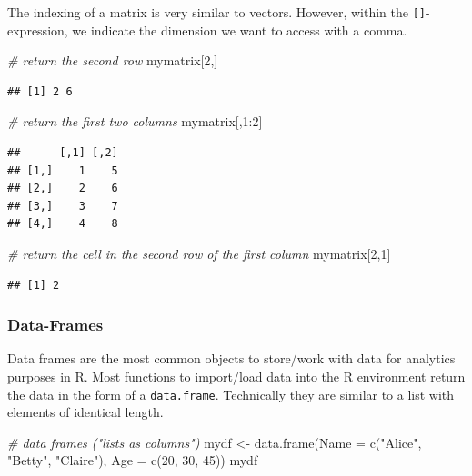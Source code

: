 \documentclass[
  12pt,
]{style/krantz}
\newenvironment{Shaded}{\begin{snugshade}}{\end{snugshade}}
\newcommand{\AttributeTok}[1]{\textcolor[rgb]{0.77,0.63,0.00}{#1}}
\newcommand{\CommentTok}[1]{\textcolor[rgb]{0.56,0.35,0.01}{\textit{#1}}}
\newcommand{\DecValTok}[1]{\textcolor[rgb]{0.00,0.00,0.81}{#1}}
\newcommand{\FunctionTok}[1]{\textcolor[rgb]{0.00,0.00,0.00}{#1}}
\newcommand{\NormalTok}[1]{#1}
\newcommand{\OtherTok}[1]{\textcolor[rgb]{0.56,0.35,0.01}{#1}}
\newcommand{\SpecialCharTok}[1]{\textcolor[rgb]{0.00,0.00,0.00}{#1}}
\newcommand{\StringTok}[1]{\textcolor[rgb]{0.31,0.60,0.02}{#1}}
\begin{document}
The indexing of a matrix is very similar to vectors. However, within the \texttt{{[}{]}}-expression, we indicate the dimension we want to access with a comma.

\begin{Shaded}
\begin{Highlighting}[]
\CommentTok{\# return the second row}
\NormalTok{mymatrix[}\DecValTok{2}\NormalTok{,]}
\end{Highlighting}
\end{Shaded}

\begin{verbatim}
## [1] 2 6
\end{verbatim}

\begin{Shaded}
\begin{Highlighting}[]
\CommentTok{\# return the first two columns}
\NormalTok{mymatrix[,}\DecValTok{1}\SpecialCharTok{:}\DecValTok{2}\NormalTok{]}
\end{Highlighting}
\end{Shaded}

\begin{verbatim}
##      [,1] [,2]
## [1,]    1    5
## [2,]    2    6
## [3,]    3    7
## [4,]    4    8
\end{verbatim}

\begin{Shaded}
\begin{Highlighting}[]
\CommentTok{\# return the cell in the second row of the first column}
\NormalTok{mymatrix[}\DecValTok{2}\NormalTok{,}\DecValTok{1}\NormalTok{]}
\end{Highlighting}
\end{Shaded}

\begin{verbatim}
## [1] 2
\end{verbatim}

\hypertarget{data-frames}{%
\subsubsection{Data-Frames}\label{data-frames}}

Data frames are the most common objects to store/work with data for analytics purposes in R. Most functions to import/load data into the R environment return the data in the form of a \texttt{data.frame}. Technically they are similar to a list with elements of identical length.

\begin{Shaded}
\begin{Highlighting}[]
\CommentTok{\# data frames ("lists as columns")}
\NormalTok{mydf }\OtherTok{\textless{}{-}} \FunctionTok{data.frame}\NormalTok{(}\AttributeTok{Name =} \FunctionTok{c}\NormalTok{(}\StringTok{"Alice"}\NormalTok{, }\StringTok{"Betty"}\NormalTok{, }\StringTok{"Claire"}\NormalTok{), }\AttributeTok{Age =} \FunctionTok{c}\NormalTok{(}\DecValTok{20}\NormalTok{, }\DecValTok{30}\NormalTok{, }\DecValTok{45}\NormalTok{))}
\NormalTok{mydf}
\end{Highlighting}
\end{Shaded}
\end{document}
